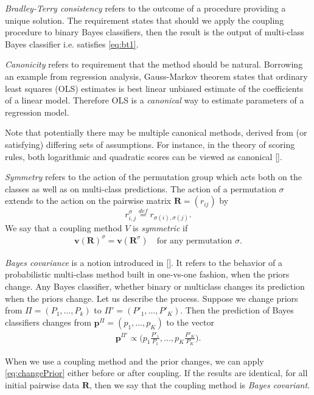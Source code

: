 \documentclass[twoside,11pt]{article}
\begin{document}
\emph{Bradley-Terry consistency} refers to the outcome of a procedure providing a unique solution. The requirement states that should we apply the coupling procedure to binary Bayes classifiers, then the result is the output of multi-class Bayes classifier i.e. satisfies \eqref{eq:bt1}.

\emph{Canonicity} refers to requirement that the method should be natural. Borrowing an example from regression analysis, Gauss-Markov theorem states that ordinary least squares (OLS) estimates is best linear unbiased estimate of the coefficients of a linear model. Therefore OLS  is a \emph{canonical} way to estimate parameters of a regression model. 

Note that potentially there may be multiple canonical methods, derived from (or satisfying) differing sets of assumptions. For instance, in the theory of scoring rules, both logarithmic and quadratic scores can be viewed as canonical [\cite{shannon1948mathematical,selten1998axiomatic}].

\emph{Symmetry} refers to the action of the permutation group which acts both on the classes as well as on multi-class predictions. The action of a permutation $\sigma$ extends to the action on the pairwise matrix $\boldsymbol{R} = (r_{ij})$ by 
\begin{equation}
	 r^\sigma_{i,j} \stackrel{def}{=}  r_{\sigma(i), \sigma(j)}.
\end{equation}
We say that a coupling method $V$ is \emph{symmetric} if 
\begin{align}
		\boldsymbol{v}(\boldsymbol{R})^\sigma = \boldsymbol{v}(\boldsymbol{R}^\sigma)\quad\textrm{for any permutation $\sigma$}.
\end{align}

\emph{Bayes covariance} is a notion introduced in  [\cite{vsuch2016bayes}]. It refers to the behavior of a probabilistic multi-class method built in one-vs-one fashion, when the priors change. Any Bayes classifier, whether binary or multiclass changes its prediction when the priors change. Let us describe the process. Suppose we change priors from $\Pi = (P_1, \ldots, P_k)$ to $\Pi'= (P'_1, \ldots, P'_K)$. Then the prediction of Bayes classifiers changes from $\boldsymbol{p}^\Pi= (p_1, \ldots, p_K)$ to the vector 
\begin{align}
\boldsymbol{p}^{\Pi'} \propto \biggl(p_1 \frac{P'_1}{P_1}, \ldots, p_K \frac{P'_K}{P_K}\biggr). \label{eq:changePrior}
\end{align}

When we use a coupling method and the prior changes, we  can apply \eqref{eq:changePrior} either before or after coupling. If the results are identical, for all initial pairwise data $\boldsymbol{R}$, then we say that the coupling method is \emph{Bayes covariant}. 
\end{document}
